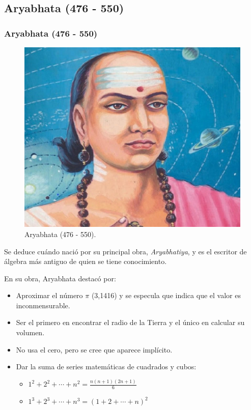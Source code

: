 \documentclass[12pt, aspectratio=169]{beamer} %
\begin{document}
	\subsection{Aryabhata (476 - 550)}
		\begin{frame}
			\frametitle{Aryabhata (476 - 550)}
			\begin{figure}
				\centering
				\includegraphics[width = .4\linewidth]{aryabhata.jpg}
				\caption{Aryabhata (476 - 550).}
			\end{figure}
		\end{frame}
		
		\begin{frame}
			Se deduce cuándo nació por su principal obra, \textit{Aryabhatiya}, y es el escritor de álgebra más antiguo
			de quien se tiene conocimiento.
			
			En su obra, Aryabhata destacó por:
			\begin{itemize}
				\item Aproximar el número $\pi$ (3,1416) y se especula que indica que el valor es inconmensurable.
				\item Ser el primero en encontrar el radio de la Tierra y el único en calcular su volumen.
				\item No usa el cero, pero se cree que aparece implícito.					
				\item Dar la suma de series matemáticas de cuadrados y cubos:
				\begin{itemize}
					\item $\displaystyle 1^2 + 2^2 + \cdots + n^2 = \frac{n(n + 1)(2n + 1)}{6}$
					\item $\displaystyle 1^{3} + 2^{3} + \cdots + n^{3} = (1+2+\cdots +n)^{2}$ 
				\end{itemize}
			\end{itemize}			
		\end{frame}
			
\end{document}
